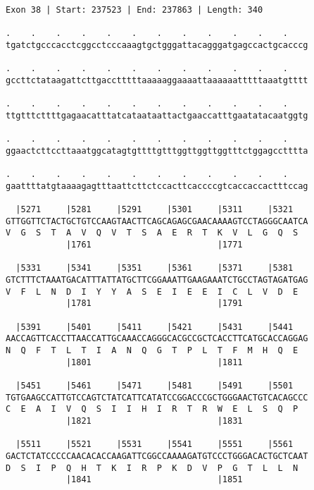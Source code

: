 \documentclass{article}
\begin{document}
\begin{Verbatim}[fontfamily=courier]
Exon 38 | Start: 237523 | End: 237863 | Length: 340

.    .    .    .    .    .    .    .    .    .    .    .    
tgatctgcccacctcggcctcccaaagtgctgggattacagggatgagccactgcacccg

.    .    .    .    .    .    .    .    .    .    .    .    
gccttctataagattcttgacctttttaaaaaggaaaattaaaaaatttttaaatgtttt

.    .    .    .    .    .    .    .    .    .    .    .    
ttgtttcttttgagaacatttatcataataattactgaaccatttgaatatacaatggtg

.    .    .    .    .    .    .    .    .    .    .    .    
ggaactcttccttaaatggcatagtgttttgtttggttggttggtttctggagcctttta

.    .    .    .    .    .    .    .    .    .    .    .    
gaattttatgtaaaagagtttaattcttctccacttcaccccgtcaccaccactttccag

  |5271     |5281     |5291     |5301     |5311     |5321   
GTTGGTTCTACTGCTGTCCAAGTAACTTCAGCAGAGCGAACAAAAGTCCTAGGGCAATCA
V  G  S  T  A  V  Q  V  T  S  A  E  R  T  K  V  L  G  Q  S  
            |1761                         |1771             

  |5331     |5341     |5351     |5361     |5371     |5381   
GTCTTTCTAAATGACATTTATTATGCTTCGGAAATTGAAGAAATCTGCCTAGTAGATGAG
V  F  L  N  D  I  Y  Y  A  S  E  I  E  E  I  C  L  V  D  E  
            |1781                         |1791             

  |5391     |5401     |5411     |5421     |5431     |5441   
AACCAGTTCACCTTAACCATTGCAAACCAGGGCACGCCGCTCACCTTCATGCACCAGGAG
N  Q  F  T  L  T  I  A  N  Q  G  T  P  L  T  F  M  H  Q  E  
            |1801                         |1811             

  |5451     |5461     |5471     |5481     |5491     |5501   
TGTGAAGCCATTGTCCAGTCTATCATTCATATCCGGACCCGCTGGGAACTGTCACAGCCC
C  E  A  I  V  Q  S  I  I  H  I  R  T  R  W  E  L  S  Q  P  
            |1821                         |1831             

  |5511     |5521     |5531     |5541     |5551     |5561   
GACTCTATCCCCCAACACACCAAGATTCGGCCAAAAGATGTCCCTGGGACACTGCTCAAT
D  S  I  P  Q  H  T  K  I  R  P  K  D  V  P  G  T  L  L  N  
            |1841                         |1851             

\end{Verbatim}
\newpage
\end{document}
